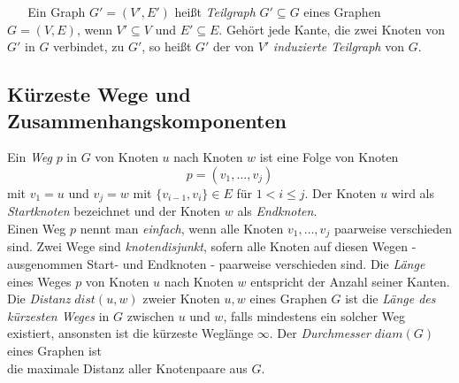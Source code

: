 ~\linebreak
\vspace{-2mm}
~\linebreak
Ein Graph $G'=(V',E')$ heißt \emph{Teilgraph} $G'\subseteq G$ eines Graphen $G=(V,E)$, wenn $V'\subseteq V$ und $E'\subseteq E$. Gehört jede Kante, die zwei Knoten von $G'$ in $G$ verbindet, zu $G'$, so heißt $G'$ der von $V'$ \emph{induzierte Teilgraph} von $G$. 
\subsection{Kürzeste Wege und Zusammenhangskomponenten}
Ein \emph{Weg} $p$ in $G$ von Knoten $u$ nach Knoten $w$ ist eine Folge von Knoten $$p=(v_1,\ldots,v_j)$$ mit $v_1=u$ und $v_j=w$ mit $\{v_{i-1},v_i\}\in E$ für $1 <i \leq j$. Der Knoten $u$ wird als \emph{Startknoten} bezeichnet und der Knoten $w$ als \emph{Endknoten}.\\Einen Weg $p$ nennt man \emph{einfach}, wenn alle Knoten $v_1,\ldots,v_j$ paarweise verschieden sind. Zwei Wege sind \emph{knotendisjunkt}, sofern alle Knoten auf diesen Wegen - ausgenommen Start- und Endknoten - paarweise verschieden sind. Die \emph{Länge} eines Weges $p$ von Knoten $u$ nach Knoten $w$ entspricht der Anzahl seiner Kanten.\vspace{-1mm}\newline\newline
Die \emph{Distanz} $dist(u,w)$ zweier Knoten $u,w$ eines Graphen $G$ ist die \emph{Länge des kürzesten Weges} in $G$ zwischen $u$ und $w$, falls mindestens ein solcher Weg existiert, ansonsten ist die kürzeste Weglänge $\infty$. Der \emph{Durchmesser} $diam(G)$ eines Graphen ist\\die maximale Distanz aller Knotenpaare aus $G$.

